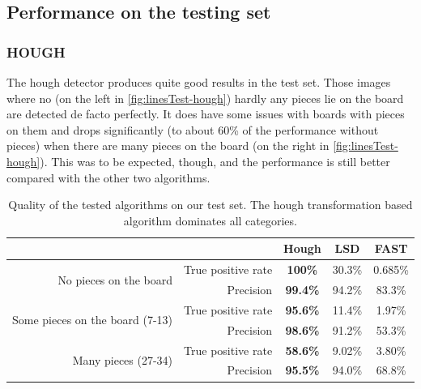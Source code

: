 	\subsection{Performance on the testing set}
	\subsubsection{HOUGH}
	The hough detector produces quite good results in the test set. Those images where no (on the left in \autoref{fig:linesTest-hough}) hardly any pieces lie on the board are detected de facto perfectly. It does have some issues with boards with pieces on them and drops significantly (to about 60\% of the performance without pieces) when there are many pieces on the board (on the right in \autoref{fig:linesTest-hough}). This was to be expected, though, and the performance is still better compared with the other two algorithms.

	\begin{table}[b]
		\begin{tabular}{|r|r||>{\bfseries}c|c|c|}
			\cline{3-5}
		    \multicolumn{2}{c|}{}											 		& Hough 	& LSD 		& FAST     \\
			\cline{3-5}
			\hline
			\multirow{2}{*}{No pieces on the board}   		& True positive rate 	& 100\% 	& 30.3\%  	& 0.685\%  \\
															& Precision			 	& 99.4\% 	& 94.2\%  	& 83.3\%  \\
			\hline
			\multirow{2}{*}{Some pieces on the board (7-13)}& True positive rate 	& 95.6\% 	& 11.4\% 	& 1.97\%   \\
															& Precision 			& 98.6\% 	& 91.2\%  	& 53.3\%  \\
			\hline
			\multirow{2}{*}{Many pieces (27-34)} 			& True positive rate 	& 58.6\% 	& 9.02\% 	& 3.80\%   \\
															& Precision			 	& 95.5\% 	& 94.0\%  	& 68.8\%  \\
			\hline
		\end{tabular}
		\caption{Quality of the tested algorithms on our test set. The hough transformation based algorithm dominates all categories.}
		\label{tab:linesTest}
	\end{table}

